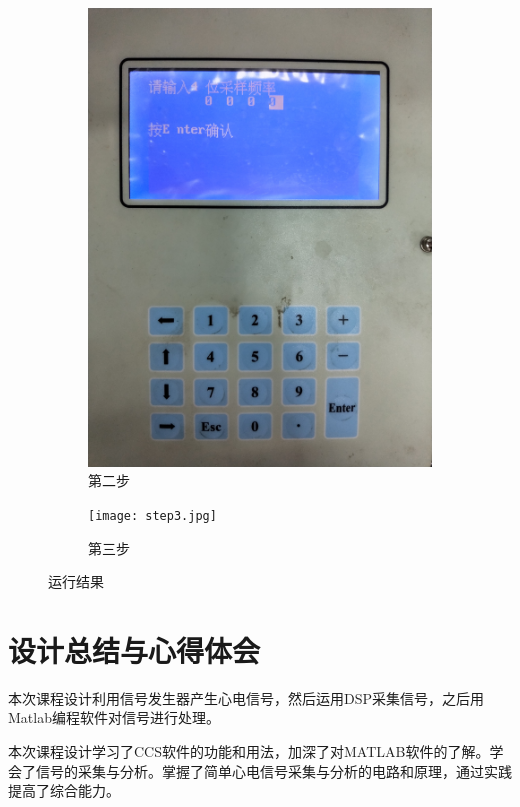 \documentclass{article}
\newcounter{sub}
\begin{document}
\begin{figure}[H]
\begin{subfigure}[H]{.3\linewidth}
		\includegraphics[width=\linewidth]{step2.jpg}
		\caption{第二步}
		\label{fig:第二步}
	\end{subfigure}
	\quad
	\begin{subfigure}[H]{.3\linewidth}
		\centering
		\texttt{[image: step3.jpg]}
		\caption{第三步}
		\label{fig:第三步}
	\end{subfigure}
	\caption{运行结果}
	\label{fig:运行结果}
\end{figure}

\section{设计总结与心得体会}%
\label{sec:设计总结与心得体会}

本次课程设计利用信号发生器产生心电信号，然后运用DSP采集信号，之后用Matlab编程软件对信号进行处理。

本次课程设计学习了CCS软件的功能和用法，加深了对MATLAB软件的了解。学会了信号的采集与分析。掌握了简单心电信号采集与分析的电路和原理，通过实践提高了综合能力。
\end{document}
